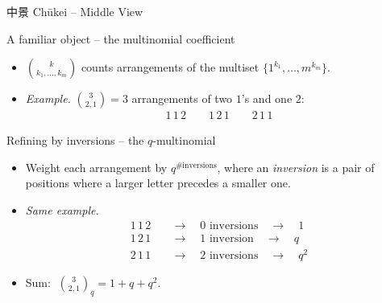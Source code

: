 \documentclass{beamer}
\renewcommand{\>}{\rangle}
\newcommand{\<}{\langle}
\begin{document}
\begin{frame}{中景 Chūkei -- Middle View}
\begin{center}
\end{center}
\end{frame}



\begin{frame}{A familiar object -- the multinomial coefficient}

\begin{itemize}
    \item $\binom{k}{k_1,\ldots,k_m}$ counts arrangements of the multiset
    $\{1^{k_1},\ldots,m^{k_m}\}$.

    \bigskip
    \item \textit{Example.} $\binom{3}{2,1} = 3$ arrangements of two
    $1$'s and one $2$:
    \begin{align*}
        1\,1\,2 \qquad 1\,2\,1 \qquad 2\,1\,1
    \end{align*}
\end{itemize}
\end{frame}


\begin{frame}{Refining by inversions -- the $q$-multinomial}

\begin{itemize}
    \item Weight each arrangement by $q^{\#\mathrm{inversions}}$, where an
    \emph{inversion} is a pair of positions where a larger letter
    precedes a smaller one.

    \bigskip
    \item \textit{Same example.}
    \begin{align*}
        1\,1\,2 \quad &\to \quad 0 \text{ inversions} \quad\to\quad 1 \\[2pt]
        1\,2\,1 \quad &\to \quad 1 \text{ inversion} \quad\to\quad q \\[2pt]
        2\,1\,1 \quad &\to \quad 2 \text{ inversions} \quad\to\quad q^2
    \end{align*}

    \medskip
    \item Sum: $\;\binom{3}{2,1}_q = 1 + q + q^2$.
\end{itemize}
\end{frame}
\end{document}
